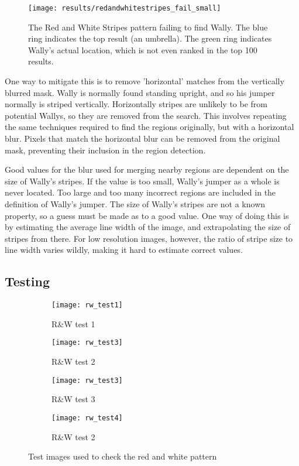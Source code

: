 \documentclass[../main.tex]{subfiles}
\begin{document}
    \begin{figure}[H]
      \centering
      \texttt{[image: results/redandwhitestripes\_fail\_small]}
      \caption{
        The Red and White Stripes pattern failing to find Wally.
        The blue ring indicates the top result (an umbrella).
        The green ring indicates Wally's actual location, which is not even ranked in the top 100 results.
      }
      \label{rws_fail_small}
    \end{figure}

    One way to mitigate this is to remove 'horizontal' matches from the vertically blurred mask.
    Wally is normally found standing upright, and so his jumper normally is striped vertically.
    Horizontally stripes are unlikely to be from potential Wallys, so they are removed from the search.
    This involves repeating the same techniques required to find the regions originally, but with a horizontal blur.
    Pixels that match the horizontal blur can be removed from the original mask, preventing their inclusion in the region detection.

    Good values for the blur used for merging nearby regions are dependent on the size of Wally's stripes.
    If the value is too small, Wally's jumper as a whole is never located.
    Too large and too many incorrect regions are included in the definition of Wally's jumper.
    The size of Wally's stripes are not a known property, so a guess must be made as to a good value.
    One way of doing this is by estimating the average line width of the image, and extrapolating the size of stripes from there.
    For low resolution images, however, the ratio of stripe size to line width varies wildly, making it hard to estimate correct values.
    
  \subsection{Testing}
    \begin{figure}[H]
      \centering
      \begin{subfigure}[B]{0.4\textwidth}
        \centering
        \texttt{[image: rw\_test1]} 
        \caption{R\&W test 1}
      \end{subfigure}
      \begin{subfigure}[B]{0.4\textwidth}
        \centering
        \texttt{[image: rw\_test3]} 
        \caption{R\&W test 2}
      \end{subfigure}
      \begin{subfigure}[B]{0.4\textwidth}
        \centering
        \texttt{[image: rw\_test3]} 
        \caption{R\&W test 3}
      \end{subfigure}
      \begin{subfigure}[B]{0.4\textwidth}
        \centering
        \texttt{[image: rw\_test4]} 
        \caption{R\&W test 2}
      \end{subfigure}
      \caption{Test images used to check the red and white pattern}
    \end{figure}
\end{document}
